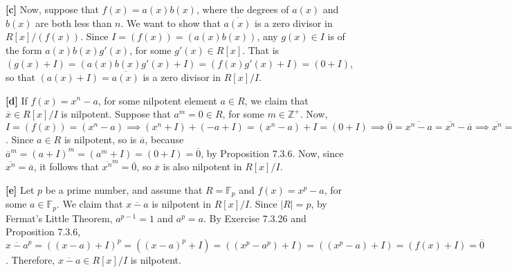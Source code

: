 \textbf{[c]} Now, suppose that $f(x) = a(x)b(x)$, where the degrees of $a(x)$ and $b(x)$ are both less than $n$. We want to show that $\overline{a(x)}$ is a zero divisor in $R[x]/(f(x))$. Since $I = (f(x)) = (a(x)b(x))$, any $g(x) \in I$ is of the form $a(x)b(x)g'(x)$, for some $g'(x) \in R[x]$. That is $(g(x) + I) = (a(x)b(x)g'(x) + I) = (f(x)g'(x) + I) = (0 + I)$, so that $(a(x) + I) = \overline{a(x)}$ is a zero divisor in $R[x]/I$.

\vspace{3 mm}

\textbf{[d]} If $f(x) = x^n - a$, for some nilpotent element $a \in R$, we claim that $\overline{x} \in R[x]/I$ is nilpotent. Suppose that $a^m = 0 \in R$, for some $m \in \mathbb{Z}^+$. Now, $I = (f(x)) = (x^n - a) \implies (x^n + I) + (-a + I) = (x^n - a) + I = (0 + I) \implies \overline{0} = \overline{x^n - a} = \overline{x^n} - \overline{a} \implies \overline{x^n} = \overline{a}$. Since $a \in R$ is nilpotent, so is $\overline{a}$, because $\overline{a}^m = (a + I)^m = (a^m + I) = (0 + I) = \overline{0}$, by Proposition 7.3.6. Now, since $\overline{x^n} = \overline{a}$, it follows that $\overline{x^n}^m = \overline{0}$, so $\overline{x}$ is also nilpotent in $R[x]/I$.

\vspace{3 mm}

\textbf{[e]} Let $p$ be a prime number, and assume that $R = \mathbb{F}_p$ and $f(x) = x^p - a$, for some $a \in \mathbb{F}_p$. We claim that $\overline{x-a}$ is nilpotent in $R[x]/I$. Since $|R| = p$, by Fermat's Little Theorem, $a^{p-1} = 1$ and $a^p = a$.
By Exercise 7.3.26 and Proposition 7.3.6, $\overline{x-a}^p = ((x-a) + I)^p = ((x-a)^p + I) = ((x^p -a^p) + I) = ((x^p - a) + I) = (f(x) + I) = \overline{0}$. Therefore, $\overline{x-a} \in R[x]/I$ is nilpotent.
